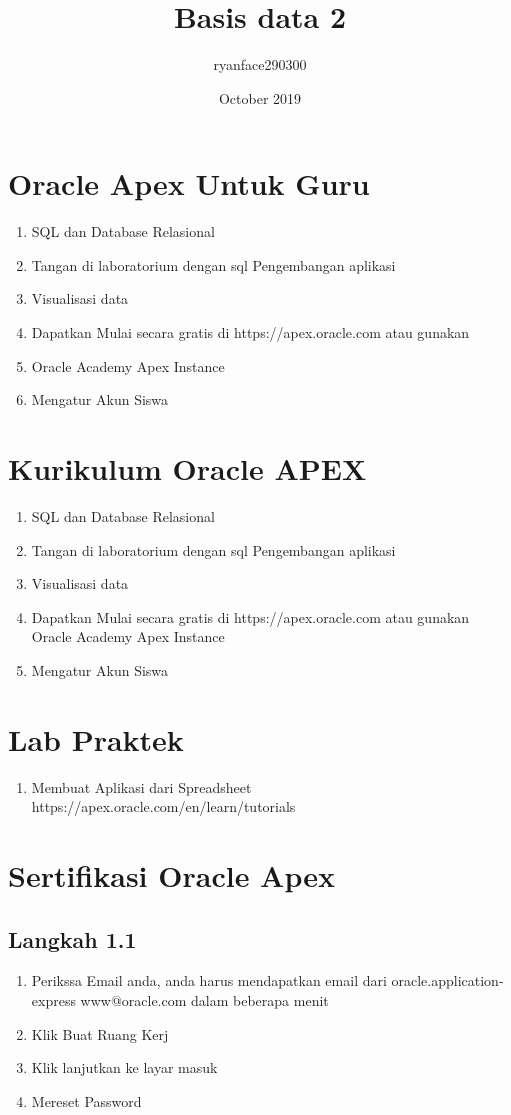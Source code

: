 \documentclass{article}
\title{Basis data 2}
\author{ryanface290300 }
\date{October 2019}
\begin{document}
\maketitle

\section{Oracle Apex Untuk Guru}
  \begin{enumerate}
      \item SQL dan Database Relasional 
      \item Tangan di laboratorium dengan sql Pengembangan aplikasi 
      \item Visualisasi data 
      \item Dapatkan Mulai secara gratis di https://apex.oracle.com atau gunakan \item Oracle Academy Apex Instance 
      \item  Mengatur Akun Siswa

  \end{enumerate}
\section{Kurikulum Oracle APEX}
   \begin{enumerate}
       \item SQL dan Database Relasional 
       \item Tangan di laboratorium dengan sql Pengembangan aplikasi 
       \item Visualisasi data 
       \item Dapatkan Mulai secara gratis di https://apex.oracle.com atau gunakan Oracle Academy Apex Instance 
       \item Mengatur Akun Siswa

   \end{enumerate}
  \section{Lab Praktek}
     \begin{enumerate}
         \item Membuat Aplikasi dari Spreadsheet
              https://apex.oracle.com/en/learn/tutorials
     \end{enumerate}
\section{Sertifikasi Oracle Apex}
\subsection{Langkah 1.1}
      \begin{enumerate}
          \item Perikssa Email anda, anda harus mendapatkan email dari oracle.application-express www@oracle.com dalam beberapa menit
          \item Klik Buat Ruang Kerj
          \item Klik lanjutkan ke layar masuk
          \item Mereset Password
    
      \end{enumerate}
\end{document}
